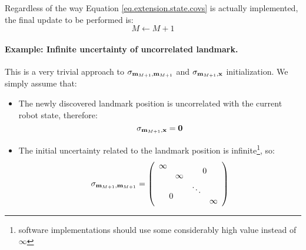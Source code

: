 	\begin{important}
		Regardless of the way Equation \ref{eq.extension.state.covs} is actually implemented, the final update to be performed is:
		\begin{equation}
			M \leftarrow M + 1
		\end{equation}
	\end{important}
	
	\paragraph{Example: Infinite uncertainty of uncorrelated landmark.}
		This is a very trivial approach to $\sigma_{\boldsymbol{\mathrm{{m}}}_{M+1},\boldsymbol{\mathrm{{m}}}_{M+1}}$ and $\sigma_{\boldsymbol{\mathrm{{m}}}_{M+1},\boldsymbol{\mathrm{{x}}}}$ initialization.
		We simply assume that:
		\begin{itemize}
			\item The newly discovered landmark position is uncorrelated with the current robot state, therefore: 
				\[
					\sigma_{\boldsymbol{\mathrm{{m}}}_{M+1},\boldsymbol{\mathrm{{x}}}} = \boldsymbol{\mathrm{{0}}}
				\]
			\item The initial uncertainty related to the landmark position is infinite\footnote{software implementations should use some considerably high value instead of $\infty$}, so:
				\[
					\sigma_{\vect{m}_{M+1},\vect{m}_{M+1}} = 
					\left(\begin{array}{cccc}
						\infty & & \multicolumn{2}{c}{\multirow{2}{*}{$0$}}\\
						& \infty & & \\
						\multicolumn{2}{c}{\multirow{2}{*}{$0$}} & \ddots & \\
						& & & \infty 
					\end{array}\right)
				\]
		\end{itemize}
		
